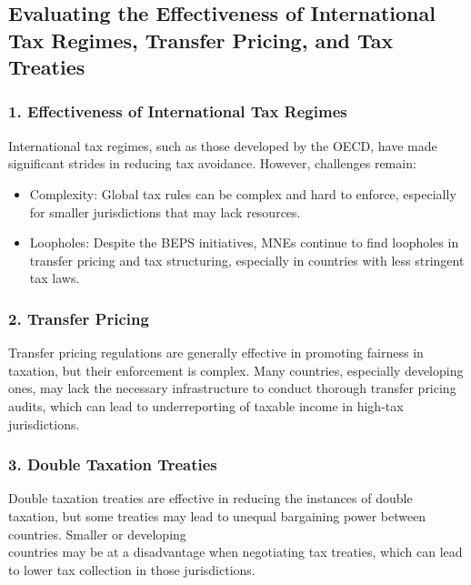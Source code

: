 \documentclass[10pt]{article}
\begin{document}
\subsection*{Evaluating the Effectiveness of International Tax Regimes, Transfer Pricing, and Tax Treaties}
\subsubsection*{1. Effectiveness of International Tax Regimes}
International tax regimes, such as those developed by the OECD, have made significant strides in reducing tax avoidance. However, challenges remain:

\begin{itemize}
  \item Complexity: Global tax rules can be complex and hard to enforce, especially for smaller jurisdictions that may lack resources.
  \item Loopholes: Despite the BEPS initiatives, MNEs continue to find loopholes in transfer pricing and tax structuring, especially in countries with less stringent tax laws.
\end{itemize}

\subsubsection*{2. Transfer Pricing}
Transfer pricing regulations are generally effective in promoting fairness in taxation, but their enforcement is complex. Many countries, especially developing ones, may lack the necessary infrastructure to conduct thorough transfer pricing audits, which can lead to underreporting of taxable income in high-tax jurisdictions.

\subsubsection*{3. Double Taxation Treaties}
Double taxation treaties are effective in reducing the instances of double taxation, but some treaties may lead to unequal bargaining power between countries. Smaller or developing\\
countries may be at a disadvantage when negotiating tax treaties, which can lead to lower tax collection in those jurisdictions.
\end{document}
